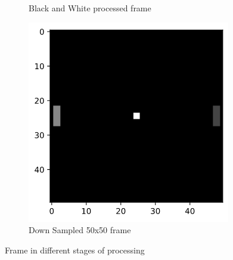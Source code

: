 \begin{figure}[htb!]
\begin{subfigure}{0.49\textwidth}
        \caption{Black and White processed frame}
        \label{fig-bw}
    \end{subfigure}

    \begin{subfigure}{0.49\textwidth}
        \centering
        \includegraphics[width=\textwidth]{figures/small.png}
        \caption{Down Sampled 50x50 frame}
    \end{subfigure}
    \caption{Frame in different stages of processing}
    \label{fig-small}
    \label{fig-process}
\end{figure}